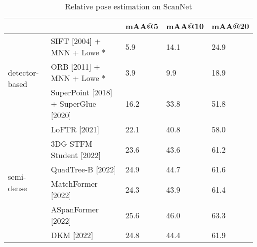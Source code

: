 \begin{table}[h!]
\centering
\caption{Relative pose estimation on ScanNet}
\label{tab:scannet_rel}
\begin{tabular}{lllll}
\toprule
 &  & mAA@5 & mAA@10 & mAA@20 \\
\midrule
\multirow[c]{3}{*}{detector-based} & SIFT [2004] \cite{lowe2004distinctive} + MNN + Lowe * & {\cellcolor[HTML]{D62F27}} \color[HTML]{F1F1F1} 5.9 & {\cellcolor[HTML]{D22B27}} \color[HTML]{F1F1F1} 14.1 & {\cellcolor[HTML]{DA362A}} \color[HTML]{F1F1F1} 24.9 \\
 & ORB [2011] \cite{rublee2011orb} + MNN + Lowe * & {\cellcolor[HTML]{B50F26}} \color[HTML]{F1F1F1} 3.9 & {\cellcolor[HTML]{A50026}} \color[HTML]{F1F1F1} 9.9 & {\cellcolor[HTML]{A50026}} \color[HTML]{F1F1F1} 18.9 \\
 & SuperPoint [2018] \cite{detone2018superpoint} + SuperGlue [2020] \cite{sarlin2020superglue} & {\cellcolor[HTML]{FFF2AA}} \color[HTML]{000000} 16.2 & {\cellcolor[HTML]{F1F9AC}} \color[HTML]{000000} 33.8 & {\cellcolor[HTML]{D1EC86}} \color[HTML]{000000} 51.8 \\
\cline{1-5}
\multirow[c]{6}{*}{semi-dense} & LoFTR [2021] \cite{sun2021loftr} & {\cellcolor[HTML]{B7E075}} \color[HTML]{000000} 22.1 & {\cellcolor[HTML]{A9DA6C}} \color[HTML]{000000} 40.8 & {\cellcolor[HTML]{93D168}} \color[HTML]{000000} 58.0 \\
 & 3DG-STFM Student [2022] \cite{mao20223dg} & {\cellcolor[HTML]{98D368}} \color[HTML]{000000} 23.6 & {\cellcolor[HTML]{82C966}} \color[HTML]{000000} 43.6 & {\cellcolor[HTML]{6BBF64}} \color[HTML]{000000} 61.2 \\
 & QuadTree-B [2022] \cite{tang2022quadtree} & {\cellcolor[HTML]{7AC665}} \color[HTML]{000000} 24.9 & {\cellcolor[HTML]{73C264}} \color[HTML]{000000} 44.7 & {\cellcolor[HTML]{66BD63}} \color[HTML]{F1F1F1} 61.6 \\
 & MatchFormer [2022] \cite{wang2022matchformer} & {\cellcolor[HTML]{89CC67}} \color[HTML]{000000} 24.3 & {\cellcolor[HTML]{7DC765}} \color[HTML]{000000} 43.9 & {\cellcolor[HTML]{69BE63}} \color[HTML]{F1F1F1} 61.4 \\
 & ASpanFormer [2022] \cite{chen2022aspanformer} & {\cellcolor[HTML]{6BBF64}} \color[HTML]{000000} 25.6 & {\cellcolor[HTML]{5DB961}} \color[HTML]{F1F1F1} 46.0 & {\cellcolor[HTML]{4EB15D}} \color[HTML]{F1F1F1} 63.3 \\
 & DKM [2022] \cite{edstedt2022deep} & {\cellcolor[HTML]{7DC765}} \color[HTML]{000000} 24.8 & {\cellcolor[HTML]{78C565}} \color[HTML]{000000} 44.4 & {\cellcolor[HTML]{63BC62}} \color[HTML]{F1F1F1} 61.9 \\

\end{tabular}
\end{table}
